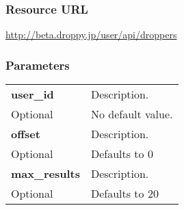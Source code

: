 \documentclass[11pt,a4paper]{article}
\newcommand{\content}[1]{\begin{minipage}{10cm}\vspace{2mm}#1\vspace{2mm}\end{minipage}}
\begin{document}
  \subsubsection*{Resource URL}
  \url{http://beta.droppy.jp/user/api/droppers}
  \subsubsection*{Parameters}
  \begin{table}[h]
    \begin{center}
      \begin{tabular}{l l}
        \hline 
      \textbf{user\_id} & \content{Description. }
      \\
      Optional & No default value.\\
      \hline
      \textbf{offset} & \content{Description. }
      \\
      Optional & Defaults to 0\\
      \hline
      \textbf{max\_results} & \content{Description. }
      \\
      Optional & Defaults to 20\\
      \hline
      \end{tabular}
    \end{center}
  \end{table}
  
      \newpage
      
\end{document}
